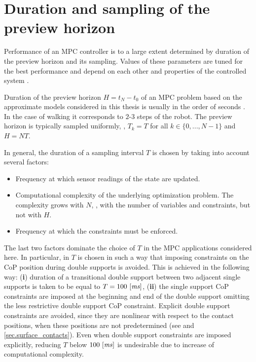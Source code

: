 \section{Duration and sampling of the preview horizon}\label{sec.sampling_interval}

Performance of an \ac{MPC} controller is to a large extent determined by
duration of the preview horizon and its sampling. Values of these parameters
are tuned for the best performance and depend on each other and properties of
the controlled system \cite[Chapter~5]{Rossiter2003mpc}.


Duration of the preview horizon $H = t_N - t_0$ of an \ac{MPC} problem based on
the approximate models considered in this thesis is usually in the order of
seconds \cite{Kajita2003icra, Herdt2010auro, Audren2014iros}. In the case of
walking it corresponds to $2$-$3$ steps of the robot. The preview horizon is
typically sampled uniformly, \IE, $T_k = T$ for all $k \in \{0, ..., N-1\}$ and
$H = N T$.


In general, the duration of a sampling interval $T$ is chosen by taking into
account several factors:
%
\begin{itemize}
    \item Frequency at which sensor readings of the state are updated.

    \item Computational complexity of the underlying optimization problem. The
        complexity grows with $N$, \IE, with the number of variables and
        constraints, but not with $H$.

    \item Frequency at which the constraints must be enforced.
\end{itemize}
%
The last two factors dominate the choice of $T$ in the \ac{MPC} applications
considered here. In particular, in \cite{Herdt2010auro} $T$ is chosen in such a
way that imposing constraints on the \ac{CoP} position during double supports
is avoided. This is achieved in the following way: ({\bf i}) duration of a
transitional double support between two adjacent single supports is taken to be
equal to $T = 100~[\mathit{ms}]$, ({\bf ii}) the single support \ac{CoP}
constraints are imposed at the beginning and end of the double support omitting
the less restrictive double support \ac{CoP} constraint. Explicit double
support constraints are avoided, since they are nonlinear with respect to the
contact positions, when these positions are not predetermined (see
\cite{Herdt2010auro} and \cref{sec.surface_contacts}). Even when double support
constraints are imposed explicitly, reducing $T$ below $100~[\mathit{ms}]$ is
undesirable due to increase of computational complexity.


